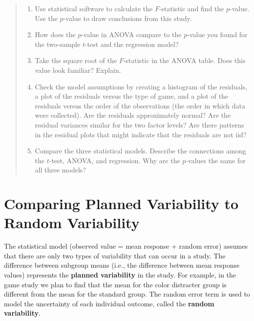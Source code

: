 \documentclass[
]{report}
\providecommand{\tightlist}{%
  \setlength{\itemsep}{0pt}\setlength{\parskip}{0pt}}
\begin{document}
\begin{quote}
\begin{enumerate}
\def\labelenumi{\arabic{enumi}.}
\setcounter{enumi}{22}
\tightlist
\item
  Use statistical software to calculate the \(F\)-statistic and find the \(p\)-value. Use the \(p\)-value to draw conclusions from this study.
\item
  How does the \(p\)-value in ANOVA compare to the \(p\)-value you found for the two-sample \(t\)-test and the regression model?
\item
  Take the square root of the \(F\)-statistic in the ANOVA table. Does this value look familiar? Explain.
\item
  Check the model assumptions by creating a histogram of the residuals, a plot of the residuals versus the type of game, and a plot of the residuals versus the order of the observations (the order in which data were collected). Are the residuals approximately normal? Are the residual variances similar for the two factor levels? Are there patterns in the residual plots that might indicate that the residuals are not iid?
\item
  Compare the three statistical models. Describe the connections among the \(t\)-test, ANOVA, and regression. Why are the \(p\)-values the same for all three models?
\end{enumerate}
\end{quote}

\hypertarget{comparing-planned-variability-to-random-variability}{%
\section{\texorpdfstring{\textbf{Comparing Planned Variability to Random Variability}}{Comparing Planned Variability to Random Variability}}\label{comparing-planned-variability-to-random-variability}}

The statistical model (observed value = mean response + random error) assumes that there are only two types of variability that can occur in a study. The difference between subgroup means (i.e., the difference between mean response values) represents the \textbf{planned variability} in the study. For example, in the game study we plan to find that the mean for the color distracter group is different from the mean for the standard group. The random error term is used to model the uncertainty of each individual outcome, called the \textbf{random variability}.
\end{document}
